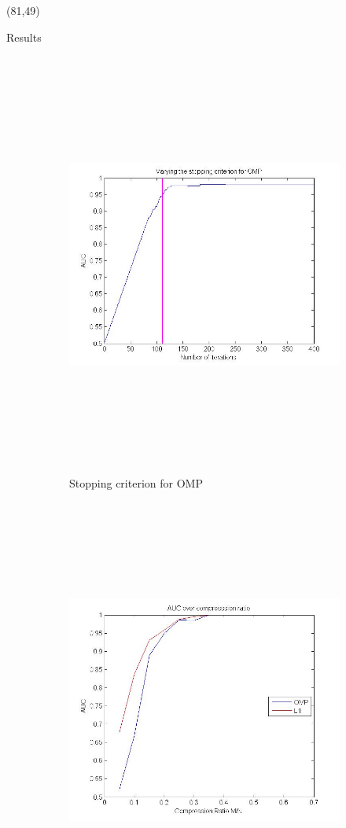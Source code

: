 \documentclass[final]{beamer}
\begin{document}
\begin{frame}{}
\begin{textblock}{36}(81,49)
  \begin{block}{Results}
    \begin{figure}
        \centering
        \begin{subfigure}[b]{0.4\textwidth}
                \centering
                \includegraphics[height=14cm]{varyingSComp}
                \caption{Stopping criterion for OMP}
        \end{subfigure}%
        \begin{subfigure}[b]{0.4\textwidth}
                \centering
                \includegraphics[height=14cm]{AUCcompressionRatio}

\end{subfigure}
\end{figure}
\end{block}
\end{textblock}
\end{frame}
\end{document}
